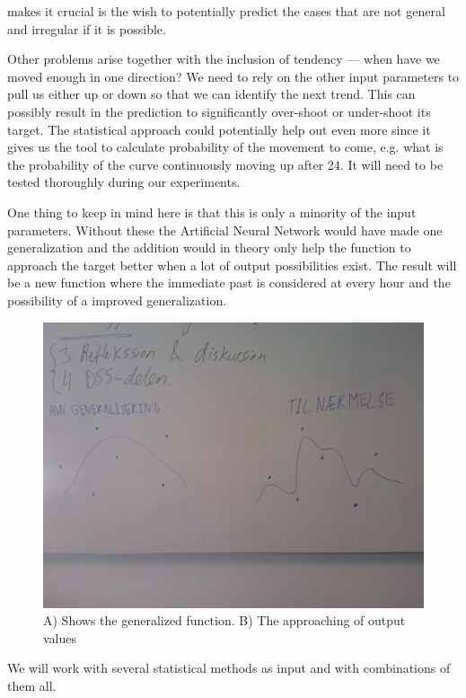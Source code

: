 makes it crucial is the wish to potentially predict the cases that are not general and irregular if it is possible.

Other problems arise together with the inclusion of tendency --- when have we moved enough in one direction? We need to rely on the other input parameters to pull us either up or down so that we can identify the next trend. This can possibly result in the prediction to significantly over-shoot or under-shoot its target. The statistical approach could potentially help out even more since it gives us the tool to calculate probability of the movement to come, e.g. what is the probability of the curve continuously moving up after 24. It will need to be tested thoroughly during our experiments. 

One thing to keep in mind here is that this is only a minority of the input parameters. Without these the Artificial Neural Network would have made one generalization and the addition would in theory only help the function to approach the target better when a lot of output possibilities exist. The result will be a new function where the immediate past is considered at every hour and the possibility of a improved generalization.

\begin{figure}[H]
\centering
\includegraphics[width=0.99\linewidth,natwidth=898,natheight=587]{billeder/WP_000057.jpg}
\caption{A) Shows the generalized function. B) The approaching of output values}
\label{fig:WP}
\end{figure}

We will work with several statistical methods as input and with combinations of them all. 

